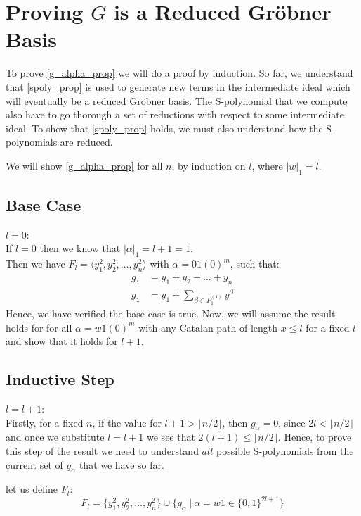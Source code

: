 \documentclass[12pt,reqno]{amsart}
\theoremstyle{plain}
\theoremstyle{definition}
\begin{document}
\section{Proving $G$ is a Reduced Gr\"obner Basis}
To prove \ref{g_alpha_prop} we will do a proof by induction. So far, we understand that \ref{spoly_prop} is used to generate new terms in the 
intermediate ideal which will eventually be a reduced Gr\"obner basis. The S-polynomial that we compute also have to go thorough a set of reductions 
with respect to some intermediate ideal. To show that \ref{spoly_prop} holds, we must also understand how the S-polynomials are reduced. 

	We will show \ref{g_alpha_prop} for all $n$, by induction on $l$, where $|w|_1 = l$.
	\subsection*{Base Case} $l = 0$: \\
	If $l = 0$ then we know that $|\alpha|_1 = l + 1 = 1$. \\ 
	Then we have $F_l = \langle y^2_1, y^2_2, \dots, y^2_n \rangle$ with $\alpha = 01(0)^m$, such that:
	\begin{align*}
		g_{\texttt{1}} &= y_1 + y_2 + \dots + y_n \\
		g_{\texttt{1}} &= y_1 + \sum_{\beta \in P_{1}^{(1)}} y^{\beta}
	\end{align*}
	Hence, we have verified the base case is true. Now, we will assume the result holds for for all $\alpha = w1(0)^m$ 
	with any Catalan path of length $x \leq l$ for a fixed $l$ and show that it holds for $l+1$. 
	\subsection*{Inductive Step} $l = l + 1$: \\
	Firstly, for a fixed $n$, if the value for $l+1 > \lfloor n/2 \rfloor$, then $g_{\alpha} = 0$, since $2l < \lfloor n/2 \rfloor$
	and once we substitute $l = l + 1$ we see that $2(l+1) \leq \lfloor n/2 \rfloor$. Hence, to prove this step of the result we need 
	to understand $all$ possible S-polynomials from the current set of $g_{\alpha}$ that we have so far.

	let us define $F_l$:
	\begin{equation*}
		F_l = \{ y^2_1, y^2_2, \dots, y^2_n\} \cup \{ g_{\alpha} \ | \ \alpha = w1 \in \{0,1\}^{2l+1} \}
	\end{equation*}
\end{document}
